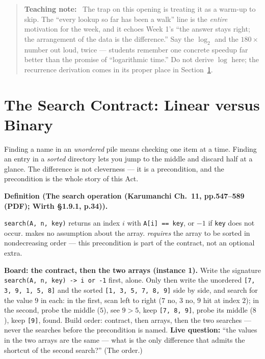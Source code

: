 \documentclass[11pt]{article}
\newenvironment{definitionbox}[1]{%
  \par\noindent\textbf{Definition (#1).}\ \itshape
}{\par\vspace{0.3em}}
\newenvironment{teachingaside}{\begin{quote}\small\color{primary-gold}\textbf{Teaching note:}\ }{\end{quote}}
\begin{document}
\begin{teachingaside}
The trap on this opening is treating it as a warm-up to skip. The ``every lookup so far has been a walk'' line is the \emph{entire} motivation for the week, and it echoes Week 1's ``the answer stays right; the arrangement of the data is the difference.'' Say the $\log_2$ and the $180\times$ number out loud, twice --- students remember one concrete speedup far better than the promise of ``logarithmic time.'' Do not derive $\log$ here; the recurrence derivation comes in its proper place in Section~\ref{sec:search}.
\end{teachingaside}

\section{The Search Contract: Linear versus Binary}
\label{sec:search}

Finding a name in an \emph{unordered} pile means checking one item at a time. Finding an entry in a \emph{sorted} directory lets you jump to the middle and discard half at a glance. The difference is not cleverness --- it is a precondition, and the precondition is the whole story of this Act.

\begin{definitionbox}{The search operation (Karumanchi Ch.~11, pp.547--589 (PDF); Wirth \S1.9.1, p.34)}
\texttt{search(A, n, key)} returns an index $i$ with \texttt{A[i] == key}, or $-1$ if \texttt{key} does not occur.  makes no assumption about the array.  \emph{requires} the array to be sorted in nondecreasing order --- this precondition is part of the contract, not an optional extra.
\end{definitionbox}

\textbf{Board: the contract, then the two arrays (instance 1).} Write the signature \texttt{search(A, n, key) -> i or -1} first, alone. Only then write the unordered \texttt{[7, 3, 9, 1, 5, 8]} and the sorted \texttt{[1, 3, 5, 7, 8, 9]} side by side, and search for the value $9$ in each: in the first, scan left to right ($7$ no, $3$ no, $9$ hit at index $2$); in the second, probe the middle ($5$), see $9 > 5$, keep \texttt{[7, 8, 9]}, probe its middle ($8$), keep \texttt{[9]}, found. Build order: contract, then arrays, then the two searches --- never the searches before the precondition is named. \textbf{Live question:} ``the values in the two arrays are the same --- what is the only difference that admits the shortcut of the second search?'' (The order.)
\end{document}

